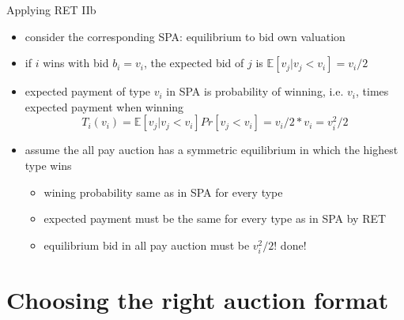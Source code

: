 \documentclass[bigger]{beamer}
\begin{document}
\begin{frame}[label={sec:orgf46d12b}]{Applying RET IIb}
\begin{itemize}
\item consider the corresponding SPA: equilibrium to bid own valuation
\item if \(i\) wins with bid \(b_i=v_i\), the expected bid of \(j\) is \(\mathbb{E}[v_j|v_j<v_i]=v_i/2\)
\item expected payment of type \(v_i\) in SPA is probability of winning, i.e. \(v_i\), times expected payment when winning
$$T_i(v_i)=\mathbb{E}[v_j|v_j<v_i]Pr[v_j<v_i]=v_i/2 * v_i=v_i^2/2$$
\item assume the all pay auction has a symmetric equilibrium in which the highest type wins
\begin{itemize}
\item wining probability same as in SPA for every type
\item expected payment must be the same for every type as in SPA by RET
\item equilibrium bid in all pay auction must be \(v_i^2/2\)! done!
\end{itemize}
\end{itemize}
\end{frame}

\section{Choosing the right auction format}
\label{sec:org80fe3e1}
\end{document}
